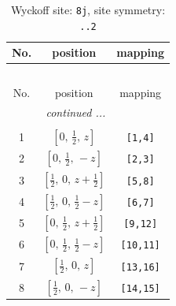 \documentclass[fleqn,8pt]{jsarticle}
\begin{document}
\begin{longtable}{ccc}
\caption{Wyckoff site: {\tt 8j}, site symmetry: {\tt ..2}}
 \\
 \hline \hline
No. & position & mapping \\ \hline \endfirsthead

\multicolumn{2}{l}{\tablename\ \thetable{}} \\
 \hline \hline
No. & position & mapping \\ \hline \endhead

 \hline \hline
\multicolumn{2}{r}{\footnotesize\it continued ...} \\ \endfoot

 \hline \hline
\multicolumn{2}{r}{} \\ \endlastfoot

1 & $\left[ 0,\, \frac{1}{2},\, z \right]$ & {\tt [1,4]} \\ \hline
2 & $\left[ 0,\, \frac{1}{2},\, - z \right]$ & {\tt [2,3]} \\ \hline
3 & $\left[ \frac{1}{2},\, 0,\, z + \frac{1}{2} \right]$ & {\tt [5,8]} \\ \hline
4 & $\left[ \frac{1}{2},\, 0,\, \frac{1}{2} - z \right]$ & {\tt [6,7]} \\ \hline
5 & $\left[ 0,\, \frac{1}{2},\, z + \frac{1}{2} \right]$ & {\tt [9,12]} \\ \hline
6 & $\left[ 0,\, \frac{1}{2},\, \frac{1}{2} - z \right]$ & {\tt [10,11]} \\ \hline
7 & $\left[ \frac{1}{2},\, 0,\, z \right]$ & {\tt [13,16]} \\ \hline
8 & $\left[ \frac{1}{2},\, 0,\, - z \right]$ & {\tt [14,15]} \\
\end{longtable}
\renewcommand{\arraystretch}{1.2}
\end{document}
